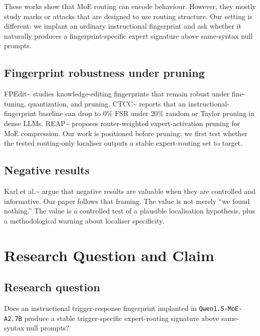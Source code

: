 \documentclass[
  11pt,
  a4paper,
]{article}
\begin{document}
These works show that MoE routing can encode behaviour. However, they
mostly study marks or attacks that are designed to use routing
structure. Our setting is different: we implant an ordinary
instructional fingerprint and ask whether it naturally produces a
fingerprint-specific expert signature above same-syntax null prompts.

\subsection{Fingerprint robustness under
pruning}\label{fingerprint-robustness-under-pruning}

FPEdit\textasciitilde{}\cite{wang2025fpedit} studies knowledge-editing
fingerprints that remain robust under fine-tuning, quantization, and
pruning. CTCC\textasciitilde{}\cite{xu2025ctcc} reports that an
instructional-fingerprint baseline can drop to 0\% FSR under 20\% random
or Taylor pruning in dense LLMs.
REAP\textasciitilde{}\cite{lasby2025reap} proposes router-weighted
expert-activation pruning for MoE compression. Our work is positioned
before pruning: we first test whether the tested routing-only localiser
outputs a stable expert-routing set to target.

\subsection{Negative results}\label{negative-results}

Karl et al.\textasciitilde{}\cite{karl2024negative} argue that negative
results are valuable when they are controlled and informative. Our paper
follows that framing. The value is not merely ``we found nothing.'' The
value is a controlled test of a plausible localisation hypothesis, plus
a methodological warning about localiser specificity.

\section{Research Question and Claim}\label{research-question-and-claim}

\subsection{Research question}\label{research-question}

Does an instructional trigger-response fingerprint implanted in
\texttt{Qwen1.5-MoE-A2.7B} produce a stable trigger-specific
expert-routing signature above same-syntax null prompts?
\end{document}

